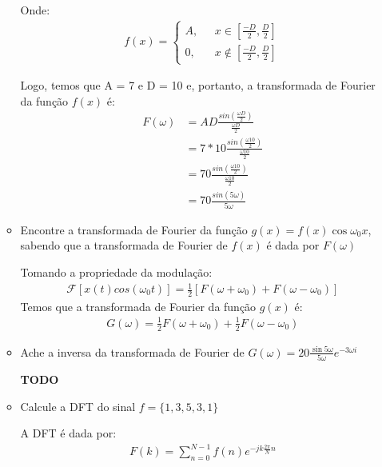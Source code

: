 \documentclass[12pt]{article}
\begin{document}
\begin{itemize}
\begin{itemize}
Onde:
\begin{eqnarray*}
f(x) = \left\{ \begin{array}{rl} 
 A, &\mbox{ $x \in  [\frac{-D}{2}, \frac{D}{2}]$} \\
 0, &\mbox{ $x \notin [\frac{-D}{2}, \frac{D}{2}]$}
       \end{array} \right.
\end{eqnarray*}

Logo, temos que A = 7 e D = 10 e, portanto, a transformada de Fourier da função $f(x)$ é:
\begin{align*}
    F(\omega) &= AD\frac{sin(\frac{\omega D}{2})}{\frac{\omega D}{2}} \\
              &= 7*10\frac{sin(\frac{\omega 10}{2})}{\frac{\omega 10}{2}} \\
              &= 70\frac{sin(\frac{\omega 10}{2})}{\frac{\omega 10}{2}} \\
              &= 70\frac{sin(5\omega)}{5\omega}
\end{align*}

\item Encontre a transformada de Fourier da função $ g(x) = f(x)\cos
   \omega_0 x$, sabendo que a transformada de Fourier de $f(x)$ é dada
   por $F(\omega)$

Tomando a propriedade da modulação:
\begin{align*}
    \mathcal{F}[x(t)cos(\omega_0t)] = \frac{1}{2}[F(\omega + \omega_0) + F(\omega - \omega_0)]
\end{align*}
Temos que a transformada de Fourier da função $g(x)$ é:
\begin{align*}
    G(\omega) = \frac{1}{2}F(\omega + \omega_0) + \frac{1}{2}F(\omega - \omega_0)
\end{align*}

\item Ache a inversa da transformada de Fourier de $G(\omega) =
  20\frac{\sin 5\omega}{5\omega}e^{-3\omega i}$
  
\textbf{TODO}
\item Calcule a DFT do sinal $f = \{1,3,5,3,1\}$

A DFT é dada por:
\begin{align*}
    F(k) = \sum\limits_{n=0}^{N-1} f(n) e^{-jk\frac{2\pi}{N}n}
\end{align*}


\end{itemize}
\end{itemize}
\end{document}
